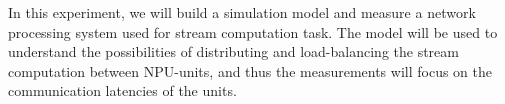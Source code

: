 In this experiment, we will build a simulation model and measure a network processing system used for stream computation task. The model will be used to understand the possibilities of distributing and load-balancing the stream computation between NPU-units, and thus the measurements will focus on the communication latencies of the units.

